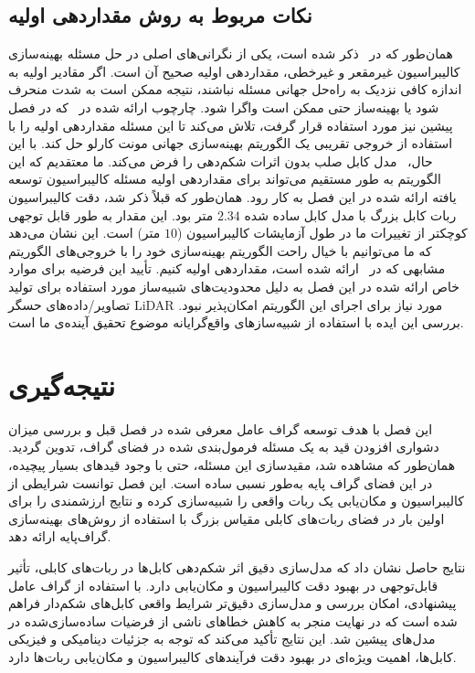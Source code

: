 \subsection{نکات مربوط به روش مقداردهی اولیه}
همان‌طور که در~\cite{khorrambakht2023graph} ذکر شده است، یکی از نگرانی‌های اصلی در حل مسئله بهینه‌سازی کالیبراسیون غیرمقعر و غیرخطی، مقداردهی اولیه صحیح آن است. اگر مقادیر اولیه به اندازه کافی نزدیک به راه‌حل جهانی مسئله نباشند، نتیجه ممکن است به شدت منحرف شود یا بهینه‌ساز حتی ممکن است واگرا شود. چارچوب ارائه شده در~\cite{khorrambakht2023graph} که در فصل پیشین نیز مورد استفاده قرار گرفت، تلاش می‌کند تا این مسئله مقداردهی اولیه را با استفاده از خروجی تقریبی یک الگوریتم بهینه‌سازی جهانی مونت کارلو حل کند. با این حال،~\cite{khorrambakht2023graph} مدل کابل صلب بدون اثرات شکم‌دهی را فرض می‌کند. ما معتقدیم که این الگوریتم به طور مستقیم می‌تواند برای مقداردهی اولیه مسئله کالیبراسیون توسعه یافته ارائه شده در این فصل به کار رود. همان‌طور که قبلاً ذکر شد، دقت کالیبراسیون ربات کابل بزرگ با مدل کابل ساده شده $2.34$ متر بود. این مقدار به طور قابل توجهی کوچکتر از تغییرات ما در طول آزمایشات کالیبراسیون ($10$ متر) است. این نشان می‌دهد که ما می‌توانیم با خیال راحت الگوریتم بهینه‌سازی خود را با خروجی‌های الگوریتم مشابهی که در~\cite{khorrambakht2023graph} ارائه شده است، مقداردهی اولیه کنیم. تأیید این فرضیه برای موارد خاص ارائه شده در این فصل به دلیل محدودیت‌های شبیه‌ساز مورد استفاده برای تولید تصاویر/داده‌های حسگر LiDAR مورد نیاز برای اجرای این الگوریتم امکان‌پذیر نبود. بررسی این ایده با استفاده از شبیه‌سازهای واقع‌گرایانه موضوع تحقیق آینده‌ی ما است.



\section{نتیجه‌گیری}
این فصل با هدف توسعه گراف عامل معرفی شده در فصل قبل و بررسی میزان دشواری افزودن قید به یک مسئله فرمول‌بندی شده در فضای گراف، تدوین گردید. همان‌طور که مشاهده شد، مقید‌سازی این مسئله، حتی با وجود قیدهای بسیار پیچیده، در این فضای گراف پایه به‌طور نسبی ساده است. این فصل توانست شرایطی از کالیبراسیون و مکان‌یابی یک ربات واقعی را شبیه‌سازی کرده و نتایج ارزشمندی را برای اولین بار در فضای ربات‌های کابلی مقیاس بزرگ با استفاده از روش‌های بهینه‌سازی گراف‌پایه ارائه دهد.

نتایج حاصل نشان داد که مدل‌سازی دقیق اثر شکم‌دهی کابل‌ها در ربات‌های کابلی، تأثیر قابل‌توجهی در بهبود دقت کالیبراسیون و مکان‌یابی دارد. با استفاده از گراف عامل پیشنهادی، امکان بررسی و مدل‌سازی دقیق‌تر شرایط واقعی کابل‌های شکم‌دار فراهم شده است که در نهایت منجر به کاهش خطاهای ناشی از فرضیات ساده‌سازی‌شده در مدل‌های پیشین شد. این نتایج تأکید می‌کند که توجه به جزئیات دینامیکی و فیزیکی کابل‌ها، اهمیت ویژه‌ای در بهبود دقت فرآیندهای کالیبراسیون و مکان‌یابی ربات‌ها دارد.

